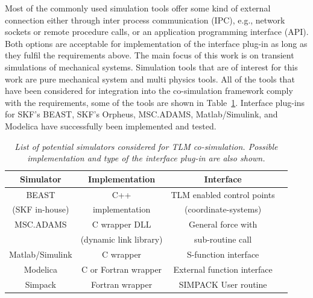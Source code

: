 
Most of the commonly used simulation tools offer some kind of external
connection either through inter process communication (IPC), e.g.,
network sockets or remote procedure calls, or an application
programming interface (API). Both options are acceptable for
implementation of the interface plug-in as long as they fulfil the
requirements above. The main focus of this work is on transient
simulations of mechanical systems. Simulation tools that are of
interest for this work are pure mechanical system and multi physics
tools. All of the tools that have been considered for integration into
the co-simulation framework comply with the requirements, some of the
tools are shown in Table~\ref{tab:SimTools}. Interface plug-ins for
SKF's BEAST, SKF's Orpheus, MSC.ADAMS, Matlab/Simulink, and Modelica
have successfully been implemented and tested.

\begin{table}
\begin{center}
\caption{\em List of potential simulators considered for TLM
co-simulation. Possible implementation and type of the interface
plug-in are also shown. }
\vspace*{1mm}
\begin{tabular}{||c|c|c|c||}

\hline
Simulator & Implementation  & Interface \\
\hline
\hline
BEAST   & C++     &  TLM enabled control points \\
(SKF in-house)	& implementation & (coordinate-systems)\\
\hline
MSC.ADAMS  & C wrapper DLL	    &  General force with \\
	   & (dynamic link library) &  sub-routine call  \\
\hline
Matlab/Simulink  & C wrapper & S-function interface \\
\hline
Modelica  & C or Fortran wrapper & External function interface\\
\hline
Simpack  & Fortran wrapper & SIMPACK User routine  \\
\hline

\end{tabular}
\label{tab:SimTools}
\end{center}
\end{table}

